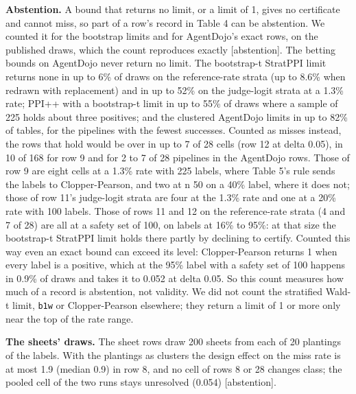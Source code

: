 \documentclass[11pt]{article}
\begin{document}
\textbf{Abstention.} A bound that returns no limit, or a limit of 1, gives no certificate and cannot miss, so part of a row's record in Table 4 can be abstention. We counted it for the bootstrap limits and for AgentDojo's exact rows, on the published draws, which the count reproduces exactly [abstention]. The betting bounds on AgentDojo never return no limit. The bootstrap-t StratPPI limit returns none in up to 6\% of draws on the reference-rate strata (up to 8.6\% when redrawn with replacement) and in up to 52\% on the judge-logit strata at a 1.3\% rate; PPI++ with a bootstrap-t limit in up to 55\% of draws where a sample of 225 holds about three positives; and the clustered AgentDojo limits in up to 82\% of tables, for the pipelines with the fewest successes. Counted as misses instead, the rows that hold would be over in up to 7 of 28 cells (row 12 at delta 0.05), in 10 of 168 for row 9 and for 2 to 7 of 28 pipelines in the AgentDojo rows. Those of row 9 are eight cells at a 1.3\% rate with 225 labels, where Table 5's rule sends the labels to Clopper-Pearson, and two at n 50 on a 40\% label, where it does not; those of row 11's judge-logit strata are four at the 1.3\% rate and one at a 20\% rate with 100 labels. Those of rows 11 and 12 on the reference-rate strata (4 and 7 of 28) are all at a safety set of 100, on labels at 16\% to 95\%: at that size the bootstrap-t StratPPI limit holds there partly by declining to certify. Counted this way even an exact bound can exceed its level: Clopper-Pearson returns 1 when every label is a positive, which at the 95\% label with a safety set of 100 happens in 0.9\% of draws and takes it to 0.052 at delta 0.05. So this count measures how much of a record is abstention, not validity. We did not count the stratified Wald-t limit, \texttt{b1w} or Clopper-Pearson elsewhere; they return a limit of 1 or more only near the top of the rate range.


\textbf{The sheets' draws.} The sheet rows draw 200 sheets from each of 20 plantings of the labels. With the plantings as clusters the design effect on the miss rate is at most 1.9 (median 0.9) in row 8, and no cell of rows 8 or 28 changes class; the pooled cell of the two runs stays unresolved (0.054) [abstention].
\end{document}

